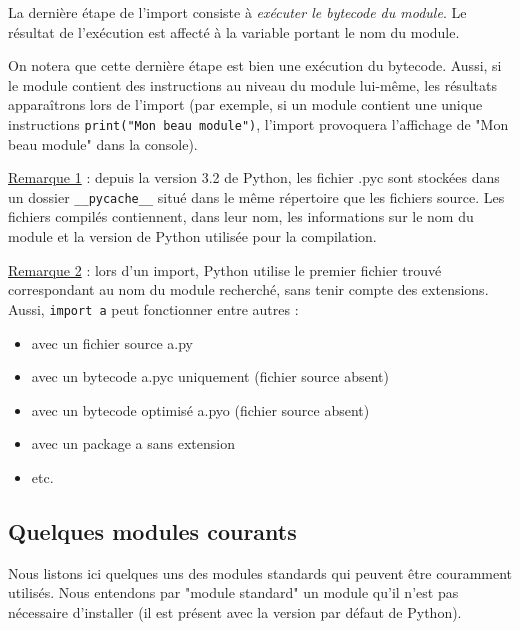 \documentclass[12pt, a4paper]{article}
\begin{document}
La dernière étape de l'import consiste à \textsl{exécuter le bytecode du module}. Le résultat de l'exécution est affecté à la variable portant le nom du module.

On notera que cette dernière étape est bien une exécution du bytecode. Aussi, si le module contient des instructions au niveau du module lui-même, les résultats apparaîtrons lors de l'import (par exemple, si un module contient une unique instructions \lstinline{print("Mon beau module")}, l'import provoquera l'affichage de "Mon beau module" dans la console).

\underline{Remarque 1} : depuis la version 3.2 de Python, les fichier .pyc sont stockées dans un dossier \lstinline{__pycache__} situé dans le même répertoire que les fichiers source. Les fichiers compilés contiennent, dans leur nom, les informations sur le nom du module et la version de Python utilisée pour la compilation.

\underline{Remarque 2} : lors d'un import, Python utilise le premier fichier trouvé correspondant au nom du module recherché, sans tenir compte des extensions. Aussi, \lstinline{import a} peut fonctionner entre autres :
\begin{itemize}
	\item avec un fichier source a.py
	\item avec un bytecode a.pyc uniquement (fichier source absent)
	\item avec un bytecode optimisé a.pyo (fichier source absent)
	\item avec un package a sans extension
	\item etc.
\end{itemize}


\subsection{Quelques modules courants}
Nous listons ici quelques uns des modules standards qui peuvent être couramment utilisés. Nous entendons par "module standard" un module qu'il n'est pas nécessaire d'installer (il est présent avec la version par défaut de Python).
\end{document}
